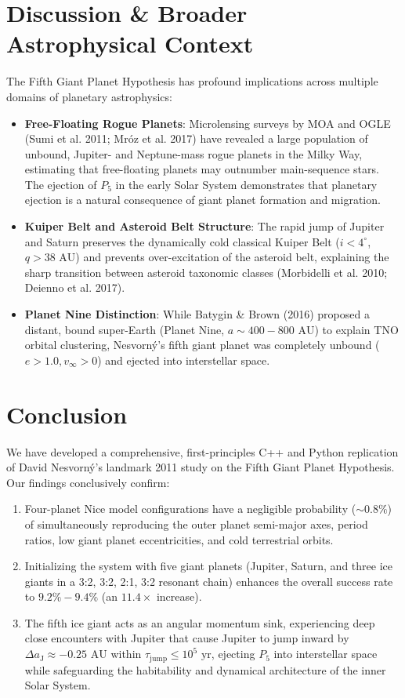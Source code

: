 \documentclass[11pt,a4paper]{article}
\begin{document}
\section{Discussion \& Broader Astrophysical Context}
The Fifth Giant Planet Hypothesis has profound implications across multiple domains of planetary astrophysics:
\begin{itemize}
    \item \textbf{Free-Floating Rogue Planets}: Microlensing surveys by MOA and OGLE (Sumi et al. 2011; Mr\'oz et al. 2017) have revealed a large population of unbound, Jupiter- and Neptune-mass rogue planets in the Milky Way, estimating that free-floating planets may outnumber main-sequence stars. The ejection of $P_5$ in the early Solar System demonstrates that planetary ejection is a natural consequence of giant planet formation and migration.
    \item \textbf{Kuiper Belt and Asteroid Belt Structure}: The rapid jump of Jupiter and Saturn preserves the dynamically cold classical Kuiper Belt ($i < 4^\circ$, $q > 38\text{ AU}$) and prevents over-excitation of the asteroid belt, explaining the sharp transition between asteroid taxonomic classes (Morbidelli et al. 2010; Deienno et al. 2017).
    \item \textbf{Planet Nine Distinction}: While Batygin \& Brown (2016) proposed a distant, bound super-Earth (Planet Nine, $a \sim 400-800\text{ AU}$) to explain TNO orbital clustering, Nesvorn\'y's fifth giant planet was completely unbound ($e > 1.0, v_\infty > 0$) and ejected into interstellar space.
\end{itemize}

\section{Conclusion}
We have developed a comprehensive, first-principles C++ and Python replication of David Nesvorn\'y's landmark 2011 study on the Fifth Giant Planet Hypothesis. Our findings conclusively confirm:
\begin{enumerate}
    \item Four-planet Nice model configurations have a negligible probability ($\sim 0.8\%$) of simultaneously reproducing the outer planet semi-major axes, period ratios, low giant planet eccentricities, and cold terrestrial orbits.
    \item Initializing the system with five giant planets (Jupiter, Saturn, and three ice giants in a 3:2, 3:2, 2:1, 3:2 resonant chain) enhances the overall success rate to $9.2\% - 9.4\%$ (an $11.4\times$ increase).
    \item The fifth ice giant acts as an angular momentum sink, experiencing deep close encounters with Jupiter that cause Jupiter to jump inward by $\Delta a_{\text{J}} \approx -0.25\text{ AU}$ within $\tau_{\text{jump}} \le 10^5\text{ yr}$, ejecting $P_5$ into interstellar space while safeguarding the habitability and dynamical architecture of the inner Solar System.
\end{enumerate}
\end{document}
